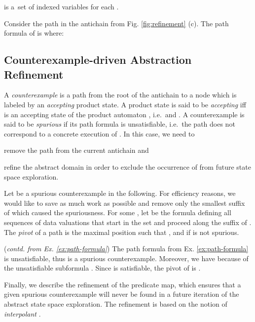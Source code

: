 \documentclass{llncs}
\begin{document}
is a~set of indexed variables for each .

\begin{example} \label{ex:path-formula} Consider the path  in
  the antichain from Fig. \ref{fig:refinement} (c). The path formula
  of  is  where:\vspace*{-1mm}
  
\end{example}

\subsection{Counterexample-driven Abstraction Refinement}\label{sec:cex}


A \emph{counterexample} is a path from the root of the antichain to a
node which is labeled by an \emph{accepting} product state. A product
state  is said to be \emph{accepting} iff
 is an accepting state of the product automaton
, i.e.\  and . A counterexample is
said to be \emph{spurious} if its path formula is unsatisfiable,
i.e.\ the path does not correspond to a concrete execution of
. In this case, we need
to \begin{inparaenum}[(i)]
\item remove the path  from the current antichain and
\item refine the abstract domain in order to exclude the occurrence of
   from future state space exploration. 
\end{inparaenum}

Let 
be a spurious counterexample in the following. For efficiency
reasons, we would like to save as much work as possible and remove
only the smallest suffix of  which caused the spuriousness. For
some , let 
be the formula defining all sequences of data valuations that start in
the set  and proceed along the suffix  of . The
\emph{pivot} of a path  is the maximal position  such
that , and  if  is not spurious.



\begin{example}\label{ex:spurious-ce}(\emph{contd. from Ex. \ref{ex:path-formula}}) 
The path formula  from Ex.  \ref{ex:path-formula} is unsatisfiable, thus
 is a spurious counterexample. Moreover, we have 
because of the unsatisfiable subformula . Since  is satisfiable, the pivot of
 is .  \end{example}

Finally, we describe the refinement of the predicate map, which
ensures that a given spurious counterexample will never be found in a
future iteration of the abstract state space exploration. The
refinement is based on the notion of \emph{interpolant}
\cite{mcmillan06}. 
\end{document}
